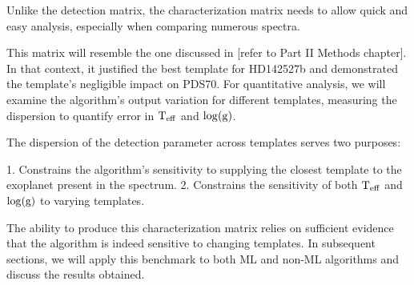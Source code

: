Unlike the detection matrix, the characterization matrix needs to allow quick and easy analysis, especially when comparing numerous spectra.

This matrix will resemble the one discussed in [refer to Part II Methods chapter]. In that context, it justified the best template for HD142527b and demonstrated the template's negligible impact on PDS70. For quantitative analysis, we will examine the algorithm's output variation for different templates, measuring the dispersion to quantify error in $\rm{T_{eff}}$ and $\rm{\log(g)}$.

The dispersion of the detection parameter across templates serves two purposes:

1. Constrains the algorithm's sensitivity to supplying the closest template to the exoplanet present in the spectrum.
2. Constrains the sensitivity of both $\rm{T_{eff}}$ and $\rm{\log(g)}$ to varying templates.

The ability to produce this characterization matrix relies on sufficient evidence that the algorithm is indeed sensitive to changing templates. In subsequent sections, we will apply this benchmark to both ML and non-ML algorithms and discuss the results obtained.

